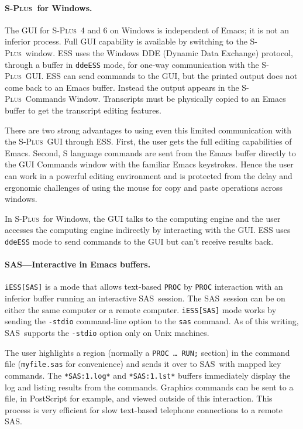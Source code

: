 \documentclass{article}
\newcommand*{\SAS}{\textsc{SAS}}
\newcommand*{\Splus}{\textsc{S-Plus}}
\newcommand{\stexttt}[1]{{\small\texttt{#1}}}
\begin{document}
\paragraph{\Splus\ for Windows.}
The GUI for \Splus\ 4 and 6 on Windows is independent of Emacs; it is not
an inferior process.  Full GUI
capability is available by switching to the \Splus\ window.
ESS uses the Windows DDE (Dynamic Data Exchange) protocol,
through a buffer in \stexttt{ddeESS} mode, for one-way communication with
the \Splus\ GUI.
ESS can send commands to the GUI, but the printed
output does not come back to an Emacs buffer.  Instead the output appears in
the \Splus\ Commands Window.  Transcripts must be physically copied to
an Emacs buffer to get the transcript editing features.

There are two strong advantages to using even this limited communication
with the \Splus\ GUI through ESS.  First, the user gets the full
editing capabilities of Emacs.  Second, S language commands are sent
from the Emacs buffer directly to the GUI Commands window with the
familiar Emacs keystrokes.  Hence the user can work in a powerful
editing environment and is protected from the delay and ergonomic
challenges of using the mouse for copy and paste operations across
windows.

In \Splus\ for Windows, the GUI
talks to the computing engine and the user accesses the computing
engine indirectly by interacting with the GUI.  ESS uses
\stexttt{ddeESS} mode to send commands to the GUI but can't receive
results back.

\paragraph{\SAS---Interactive in Emacs buffers.}

\stexttt{iESS[SAS]} is a mode that allows text-based \stexttt{PROC} by
\stexttt{PROC} interaction with an inferior buffer running an
interactive \SAS\ session.  The \SAS\ session can be on either the
same computer or a remote computer.  \stexttt{iESS[SAS]} mode works by
sending the \stexttt{-stdio} command-line option to the \stexttt{sas}
command.  As of this writing, \SAS\ supports the \stexttt{-stdio} option
only on Unix machines.

The user highlights a region (normally a \stexttt{PROC \dots\ RUN;}
section) in the command file (\stexttt{myfile.sas} for convenience)
and sends it over to \SAS\ with mapped key commands.  The
\stexttt{*SAS:1.log*} and \stexttt{*SAS:1.lst*} buffers immediately
display the log and listing results from the commands.
Graphics commands can be sent to a file, in PostScript for example,
and viewed outside of this interaction.  This process is very efficient
for slow text-based telephone connections to a remote \SAS.
\end{document}

